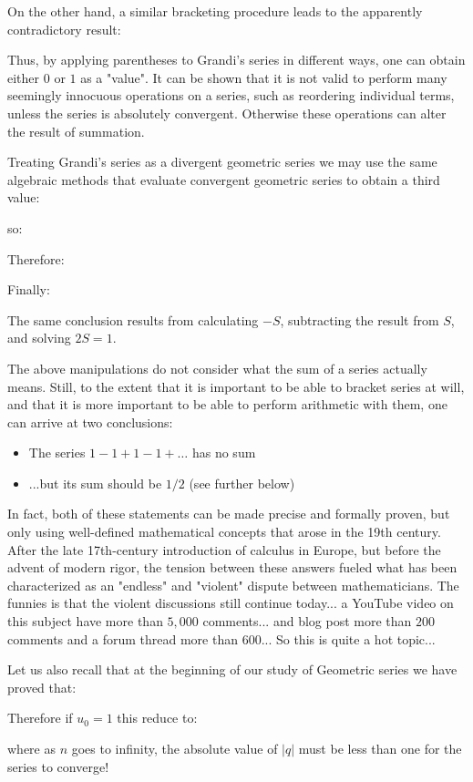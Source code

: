 	On the other hand, a similar bracketing procedure leads to the apparently contradictory result:
	
	Thus, by applying parentheses to Grandi's series in different ways, one can obtain either $0$ or $1$ as a "value". It can be shown that it is not valid to perform many seemingly innocuous operations on a series, such as reordering individual terms, unless the series is absolutely convergent. Otherwise these operations can alter the result of summation.

	Treating Grandi's series as a divergent geometric series we may use the same algebraic methods that evaluate convergent geometric series to obtain a third value:
	
	so:
	
	Therefore:
	
	Finally:
	
	The same conclusion results from calculating $-S$, subtracting the result from $S$, and solving $2S = 1$.

	The above manipulations do not consider what the sum of a series actually means. Still, to the extent that it is important to be able to bracket series at will, and that it is more important to be able to perform arithmetic with them, one can arrive at two conclusions:
	\begin{itemize}
		\item The series $1-1 + 1-1 + \ldots$ has no sum

		\item ...but its sum should be $1/2$ (see further below)
	\end{itemize}
	In fact, both of these statements can be made precise and formally proven, but only using well-defined mathematical concepts that arose in the 19th century. After the late 17th-century introduction of calculus in Europe, but before the advent of modern rigor, the tension between these answers fueled what has been characterized as an "endless" and "violent" dispute between mathematicians. The funnies is that the violent discussions still continue today... a YouTube video on this subject have more than $5,000$ comments... and blog post more than $200$ comments and a forum thread more than $600$... So this is quite a hot topic...
	
	Let us also recall that at the beginning of our study of Geometric series we have proved that:
	
	Therefore if $u_0=1$ this reduce to:
		
	where as $n$ goes to infinity, the absolute value of $|q|$ must be less than one for the series to converge!

